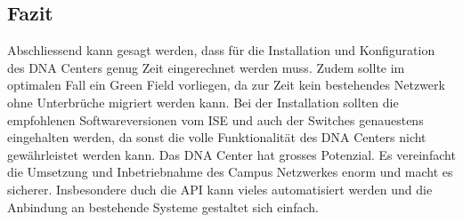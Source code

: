 \subsection{Fazit}
Abschliessend kann gesagt werden, dass für die Installation und Konfiguration des DNA Centers genug Zeit eingerechnet werden muss. Zudem sollte im optimalen Fall ein Green Field vorliegen, da zur Zeit kein bestehendes Netzwerk ohne Unterbrüche migriert werden kann. Bei der Installation sollten die empfohlenen Softwareversionen vom ISE und auch der Switches genauestens eingehalten werden, da sonst die volle Funktionalität des DNA Centers nicht gewährleistet werden kann. Das DNA Center hat grosses Potenzial. Es vereinfacht die Umsetzung und Inbetriebnahme des Campus Netzwerkes enorm und macht es sicherer. Insbesondere duch die API kann vieles automatisiert werden und die Anbindung an bestehende Systeme gestaltet sich einfach.